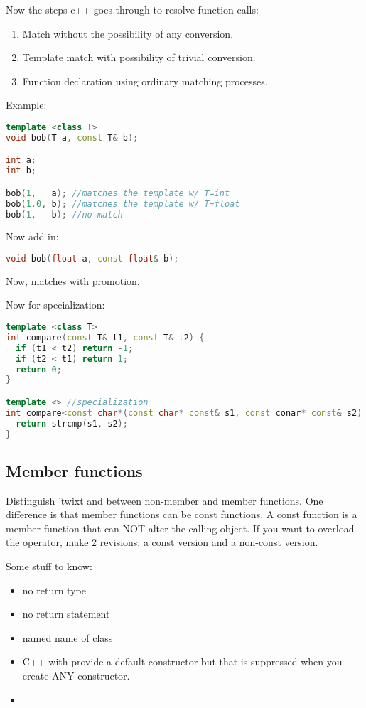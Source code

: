 Now the steps c++ goes through to resolve function calls:

\begin{enumerate}
  \item Match without the possibility of any conversion.
  \item Template match with possibility of trivial conversion.
  \item Function declaration using ordinary matching processes.
\end{enumerate}

Example:

\begin{lstlisting}[language=C++]
template <class T>
void bob(T a, const T& b);

int a;
int b;

bob(1,   a); //matches the template w/ T=int
bob(1.0, b); //matches the template w/ T=float
bob(1,   b); //no match
\end{lstlisting}

Now add in:

\begin{lstlisting}[language=C++]
void bob(float a, const float& b);
\end{lstlisting}

Now,  matches with promotion.

Now for specialization:

\begin{lstlisting}[language=C++]
template <class T>
int compare(const T& t1, const T& t2) {
  if (t1 < t2) return -1;
  if (t2 < t1) return 1;
  return 0;
}

template <> //specialization
int compare<const char*(const char* const& s1, const conar* const& s2) {
  return strcmp(s1, s2);
}
\end{lstlisting}

\subsection{Member functions}

Distinguish 'twixt and between non-member and member functions.
One difference is that member functions can be const functions. A const function is a member function that can NOT alter the calling object. If you want to overload the \cpp{[]} operator, make 2 revisions: a const version and a non-const version.

Some stuff to know:

\begin{itemize}
  \item no return type 
  \item no return statement
  \item named name of class
  \item C++ with provide a default constructor but that is suppressed when you create ANY constructor.
\end{itemize}

\begin{itemize}
  \item 
\end{itemize}
